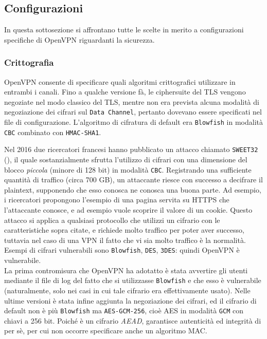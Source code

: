 \subsection{Configurazioni}
In questa sottosezione si affrontano tutte le scelte in merito a configurazioni
specifiche
di OpenVPN riguardanti la sicurezza.

\subsubsection{Crittografia}
OpenVPN consente di specificare quali algoritmi crittografici utilizzare in entrambi i canali.
Fino a qualche versione fà, le ciphersuite del TLS vengono negoziate nel
modo classico del TLS, mentre non era prevista alcuna modalità di negoziazione
dei cifrari sul \texttt{Data Channel}, pertanto dovevano essere specificati
nel file di configurazione. L'algoritmo di cifratura di default era \texttt{Blowfish}
in modalità \texttt{CBC} combinato con \texttt{HMAC-SHA1}.

Nel 2016 due ricercatori francesi hanno pubblicato un attacco chiamato \texttt{SWEET32} (\cite{BL16:Sweet32}),
il quale sostanzialmente sfrutta l'utilizzo di cifrari con una dimensione del blocco
\textit{piccola} (minore di 128 bit) in modalità \texttt{CBC}. Registrando
una sufficiente quantità di traffico (circa 700 GB), un attaccante riesce con successo
a decifrare il plaintext, supponendo che esso conosca ne conosca una buona parte.
Ad esempio, i ricercatori propongono l'esempio di una pagina servita su HTTPS che l'attaccante
conosce, e ad esempio vuole scoprire il valore di un cookie. Questo attacco si applica
a qualsiasi protocollo che utilizzi un cifrario con le caratteristiche sopra citate, e richiede
molto traffico per poter aver successo, tuttavia nel caso di una VPN il fatto che
vi sia molto traffico è la normalità.\\
Esempi di cifrari vulnerabili sono \texttt{Blowfish}, \texttt{DES}, \texttt{3DES}: quindi
OpenVPN è vulnerabile.\\
La prima contromisura che OpenVPN ha adotatto è stata
avvertire gli utenti mediante il file di log del fatto che si utilizzasse \texttt{Blowfish} e che
esso è vulnerabile (naturalmente, solo nei casi in cui tale cifrario era effettivamente
usato). Nelle ultime versioni è stata infine
aggiunta la negoziazione dei cifrari, ed il cifrario di default non è più
\texttt{Blowfish} ma \texttt{AES-GCM-256}, cioè AES in modalità \texttt{GCM} con
chiavi a 256 bit. Poiché è un cifrario \textit{AEAD}, garantisce autenticità ed
integrità di per sè, per cui non occorre specificare anche un algoritmo MAC.

